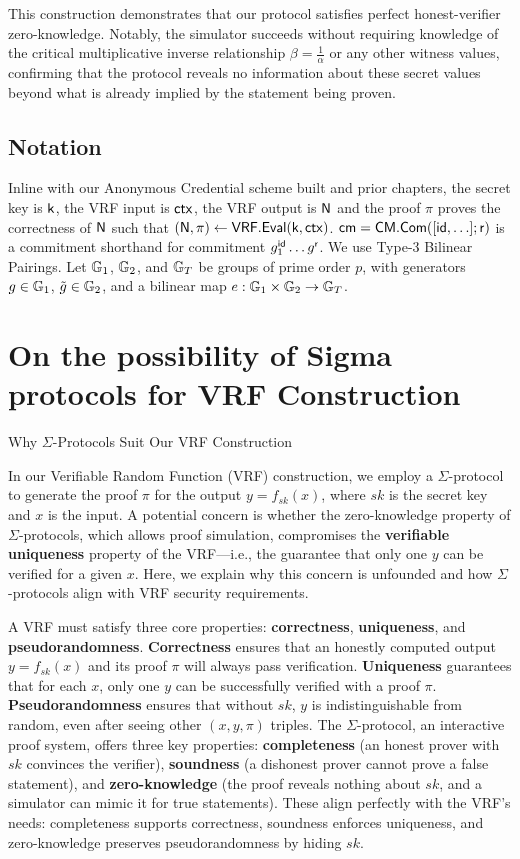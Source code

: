 This construction demonstrates that our protocol satisfies perfect honest-verifier zero-knowledge. Notably, the simulator succeeds without requiring knowledge of the critical multiplicative inverse relationship $\beta = \frac{1}{\alpha}$ or any other witness values, confirming that the protocol reveals no information about these secret values beyond what is already implied by the statement being proven.








\subsection*{Notation}
Inline with our Anonymous Credential scheme built and prior chapters, the secret key is $\mathsf{k}$, the VRF input is $\mathsf{ctx}$, the VRF output is $\mathsf{N}$ and the proof $\pi$ proves the correctness of $\mathsf{N}$ such that $(\mathsf{N}, \pi) \gets \mathsf{VRF.Eval}(\mathsf{k}, \mathsf{ctx})$. $\mathsf{cm} = \mathsf{CM.Com}([\mathsf{id},\ldots];\mathsf{r})$ is a commitment shorthand for commitment $g_1^{\mathsf{id}} \ldots g^{\mathsf{r}}$. We use Type-3 Bilinear Pairings. Let $\mathbb{G}_1$, $\mathbb{G}_2$, and $\mathbb{G}_T$ be groups of prime order $p$, with generators $g \in \mathbb{G}_1$, $\tilde{g} \in \mathbb{G}_2$, and a bilinear map $e: \mathbb{G}_1 \times \mathbb{G}_2 \to \mathbb{G}_T$.


\section{On the possibility of Sigma protocols for VRF Construction}
Why $\Sigma$-Protocols Suit Our VRF Construction

In our Verifiable Random Function (VRF) construction, we employ a $\Sigma$-protocol to generate the proof $\pi$ for the output $y = f_{sk}(x)$, where $sk$ is the secret key and $x$ is the input. A potential concern is whether the zero-knowledge property of $\Sigma$-protocols, which allows proof simulation, compromises the \textbf{verifiable uniqueness} property of the VRF—i.e., the guarantee that only one $y$ can be verified for a given $x$. Here, we explain why this concern is unfounded and how $\Sigma$-protocols align with VRF security requirements.

A VRF must satisfy three core properties: \textbf{correctness}, \textbf{uniqueness}, and \textbf{pseudorandomness}. \textbf{Correctness} ensures that an honestly computed output $y = f_{sk}(x)$ and its proof $\pi$ will always pass verification. \textbf{Uniqueness} guarantees that for each $x$, only one $y$ can be successfully verified with a proof $\pi$. \textbf{Pseudorandomness} ensures that without $sk$, $y$ is indistinguishable from random, even after seeing other $(x, y, \pi)$ triples. The $\Sigma$-protocol, an interactive proof system, offers three key properties: \textbf{completeness} (an honest prover with $sk$ convinces the verifier), \textbf{soundness} (a dishonest prover cannot prove a false statement), and \textbf{zero-knowledge} (the proof reveals nothing about $sk$, and a simulator can mimic it for true statements). These align perfectly with the VRF's needs: completeness supports correctness, soundness enforces uniqueness, and zero-knowledge preserves pseudorandomness by hiding $sk$.

